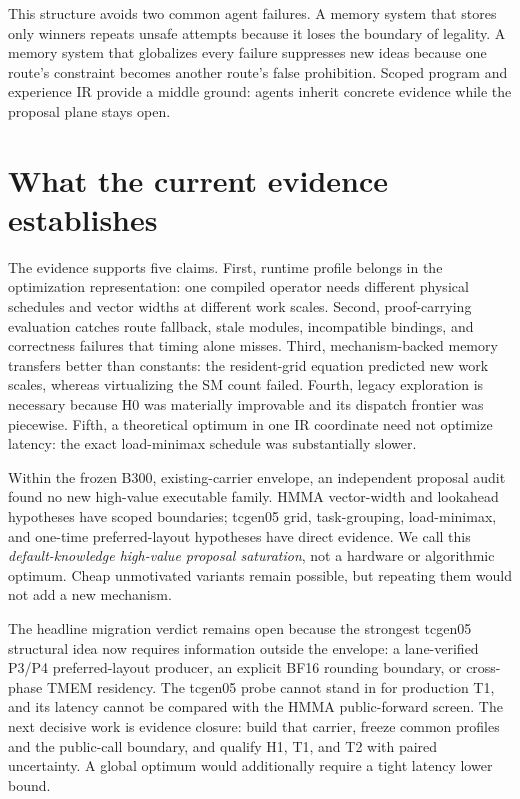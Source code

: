 \documentclass[11pt]{article}
\begin{document}
This structure avoids two common agent failures. A memory system that stores only winners repeats unsafe attempts because it loses the boundary of legality. A memory system that globalizes every failure suppresses new ideas because one route's constraint becomes another route's false prohibition. Scoped program and experience IR provide a middle ground: agents inherit concrete evidence while the proposal plane stays open.

\section{What the current evidence establishes}

The evidence supports five claims. First, runtime profile belongs in the optimization representation: one compiled operator needs different physical schedules and vector widths at different work scales. Second, proof-carrying evaluation catches route fallback, stale modules, incompatible bindings, and correctness failures that timing alone misses. Third, mechanism-backed memory transfers better than constants: the resident-grid equation predicted new work scales, whereas virtualizing the SM count failed. Fourth, legacy exploration is necessary because H0 was materially improvable and its dispatch frontier was piecewise. Fifth, a theoretical optimum in one IR coordinate need not optimize latency: the exact load-minimax schedule was substantially slower.

Within the frozen B300, existing-carrier envelope, an independent proposal audit found no new high-value executable family. HMMA vector-width and lookahead hypotheses have scoped boundaries; tcgen05 grid, task-grouping, load-minimax, and one-time preferred-layout hypotheses have direct evidence. We call this \emph{default-knowledge high-value proposal saturation}, not a hardware or algorithmic optimum. Cheap unmotivated variants remain possible, but repeating them would not add a new mechanism.

The headline migration verdict remains open because the strongest tcgen05 structural idea now requires information outside the envelope: a lane-verified P3/P4 preferred-layout producer, an explicit BF16 rounding boundary, or cross-phase TMEM residency. The tcgen05 probe cannot stand in for production T1, and its latency cannot be compared with the HMMA public-forward screen. The next decisive work is evidence closure: build that carrier, freeze common profiles and the public-call boundary, and qualify H1, T1, and T2 with paired uncertainty. A global optimum would additionally require a tight latency lower bound.
\end{document}
